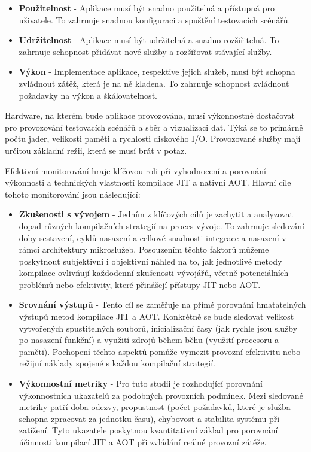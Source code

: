 \begin{itemize}
  \item \textbf{Použitelnost} - Aplikace musí být snadno použitelná a přístupná pro uživatele. To zahrnuje snadnou konfiguraci a spuštění testovacích scénářů.
  \item \textbf{Udržitelnost} - Aplikace musí být udržitelná a snadno rozšiřitelná. To zahrnuje schopnost přidávat nové služby a rozšiřovat stávající služby.
  \item \textbf{Výkon} - Implementace aplikace, respektive jejich služeb, musí být schopna zvládnout zátěž, která je na ně kladena. To zahrnuje schopnost zvládnout požadavky na výkon a škálovatelnost.
\end{itemize}


Hardware, na kterém bude aplikace provozována, musí výkonnostně dostačovat pro provozování testovacích scénářů a sběr a vizualizaci dat. Týká se to primárně počtu jader, velikosti paměti a rychlosti diskového I/O. Provozované služby mají určitou základní režii, která se musí brát v potaz.


Efektivní monitorování hraje klíčovou roli při vyhodnocení a porovnání výkonnosti a technických vlastností kompilace JIT a nativní AOT. Hlavní cíle tohoto monitorování jsou následující:

\begin{itemize}
  \item \textbf{Zkušenosti s vývojem} - Jedním z klíčových cílů je zachytit a analyzovat dopad různých kompilačních strategií na proces vývoje. To zahrnuje sledování doby sestavení, cyklů nasazení a celkové snadnosti integrace a nasazení v rámci architektury mikroslužeb. Posouzením těchto faktorů můžeme poskytnout subjektivní i objektivní náhled na to, jak jednotlivé metody kompilace ovlivňují každodenní zkušenosti vývojářů, včetně potenciálních problémů nebo efektivity, které přinášejí přístupy JIT nebo AOT.
  \item \textbf{Srovnání výstupů} - Tento cíl se zaměřuje na přímé porovnání hmatatelných výstupů metod kompilace JIT a AOT. Konkrétně se bude sledovat velikost vytvořených spustitelných souborů, inicializační časy (jak rychle jsou služby po nasazení funkční) a využití zdrojů během běhu (využití procesoru a paměti). Pochopení těchto aspektů pomůže vymezit provozní efektivitu nebo režijní náklady spojené s každou kompilační strategií.
  \item \textbf{Výkonnostní metriky} - Pro tuto studii je rozhodující porovnání výkonnostních ukazatelů za podobných provozních podmínek. Mezi sledované metriky patří doba odezvy, propustnost (počet požadavků, které je služba schopna zpracovat za jednotku času), chybovost a stabilita systému při zatížení. Tyto ukazatele poskytnou kvantitativní základ pro porovnání účinnosti kompilací JIT a AOT při zvládání reálné provozní zátěže.
\end{itemize}

